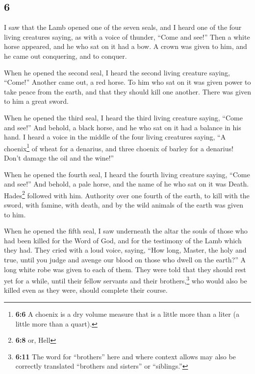 \begin{paracol}{2}
\switchcolumn
\begin{otherlanguage}{english}

\hypertarget{section-11}{%
\section{6}\label{section-11}}

 I saw that the Lamb opened one of the seven seals, and I
heard one of the four living creatures saying, as with a voice of
thunder, ``Come and see!''  Then a white horse appeared,
and he who sat on it had a bow. A crown was given to him, and he came
out conquering, and to conquer.

 When he opened the second seal, I heard the second living
creature saying, ``Come!''  Another came out, a red horse.
To him who sat on it was given power to take peace from the earth, and
that they should kill one another. There was given to him a great sword.

 When he opened the third seal, I heard the third living
creature saying, ``Come and see!'' And behold, a black horse, and he who
sat on it had a balance in his hand.  I heard a voice in
the middle of the four living creatures saying, ``A choenix\footnote{\textbf{6:6}
  A choenix is a dry volume measure that is a little more than a liter
  (a little more than a quart).} of wheat for a denarius, and three
choenix of barley for a denarius! Don't damage the oil and the wine!''

 When he opened the fourth seal, I heard the fourth living
creature saying, ``Come and see!''  And behold, a pale
horse, and the name of he who sat on it was Death. Hades\footnote{\textbf{6:8}
  or, Hell} followed with him. Authority over one fourth of the earth,
to kill with the sword, with famine, with death, and by the wild animals
of the earth was given to him.

 When he opened the fifth seal, I saw underneath the altar
the souls of those who had been killed for the Word of God, and for the
testimony of the Lamb which they had.  They cried with a
loud voice, saying, ``How long, Master, the holy and true, until you
judge and avenge our blood on those who dwell on the earth?''
 A long white robe was given to each of them. They were
told that they should rest yet for a while, until their fellow servants
and their brothers,\footnote{\textbf{6:11} The word for ``brothers''
  here and where context allows may also be correctly translated
  ``brothers and sisters'' or ``siblings.''} who would also be killed
even as they were, should complete their course.


\end{otherlanguage}
\end{paracol}
